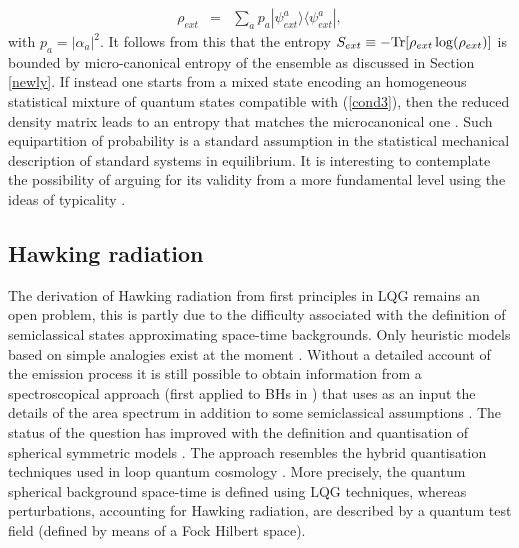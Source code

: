 \documentclass[aps, nofootinbib,superscriptaddress,12pt]{revtex4-2}
\def\ba{\begin{eqnarray}}
\def\ea{\end{eqnarray}}
\begin{document}
\ba
 \rho_{ext}
&=&\sum\limits_a p_a |\psi^{a}_{ext}\rangle\langle \psi^{a}_{ext}|, 
\ea
with $p_a=|\alpha_a|^2$. It follows from this that the entropy $S_{ext}\equiv -{\rm Tr}[\rho_{ext} \log(\rho_{ext})]$ is  bounded by micro-canonical entropy of the ensemble as discussed in Section \ref{newly}. 
If instead one starts from a mixed state encoding an homogeneous statistical mixture of quantum states compatible with  (\ref{cond3}), then the reduced density matrix leads to an entropy that matches the microcanonical one \cite{Perez:2014ura}. Such equipartition of probability is a standard assumption in the statistical mechanical description of standard systems in equilibrium. It is interesting to contemplate the possibility of arguing for its validity from a more fundamental level using the ideas of typicality \cite{popescu}. 
 



\subsection{Hawking radiation}\label{HR}

The derivation of Hawking radiation from first principles in LQG remains an open problem, this is partly due to the difficulty associated with the definition of semiclassical states approximating space-time backgrounds. Only heuristic models based on simple analogies exist at the moment  \cite{Heidmann:2016yfz}. 
Without a detailed account of the emission process it is still possible to obtain information from a spectroscopical approach (first applied to BHs in \cite{Bekenstein:1995ju, Krasnov:1997yt}) that uses as an input the details of the area spectrum in addition to some semiclassical assumptions \cite{Barrau:2011md, Barrau:2015ana}. 
The status of the question has improved with the definition and quantisation of spherical symmetric models
\cite{Gambini:2013nea, Gambini:2013hna, Gambini:2013exa}. The approach resembles the hybrid quantisation techniques used in loop quantum cosmology \cite{Agullo:2016tjh, Ashtekar:2011ni}. More precisely, the quantum spherical background space-time is defined using LQG techniques, whereas perturbations, accounting for Hawking radiation, are described by a quantum test field (defined by means of a Fock Hilbert space). 
\end{document}
